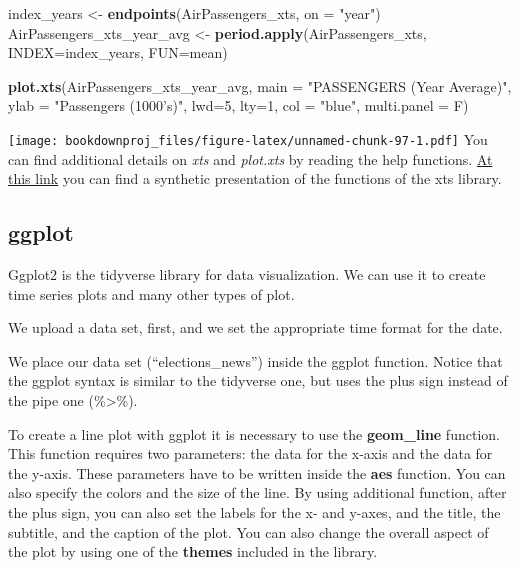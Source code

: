 \documentclass[
]{article}
\newenvironment{Shaded}{\begin{snugshade}}{\end{snugshade}}
\newcommand{\DataTypeTok}[1]{\textcolor[rgb]{0.13,0.29,0.53}{#1}}
\newcommand{\DecValTok}[1]{\textcolor[rgb]{0.00,0.00,0.81}{#1}}
\newcommand{\KeywordTok}[1]{\textcolor[rgb]{0.13,0.29,0.53}{\textbf{#1}}}
\newcommand{\NormalTok}[1]{#1}
\newcommand{\StringTok}[1]{\textcolor[rgb]{0.31,0.60,0.02}{#1}}
\begin{document}
\begin{Shaded}
\begin{Highlighting}[]
\NormalTok{index_years <-}\StringTok{ }\KeywordTok{endpoints}\NormalTok{(AirPassengers_xts, }\DataTypeTok{on =} \StringTok{"year"}\NormalTok{)}
\NormalTok{AirPassengers_xts_year_avg <-}\StringTok{ }\KeywordTok{period.apply}\NormalTok{(AirPassengers_xts, }\DataTypeTok{INDEX=}\NormalTok{index_years, }\DataTypeTok{FUN=}\NormalTok{mean)}

\KeywordTok{plot.xts}\NormalTok{(AirPassengers_xts_year_avg,}
         \DataTypeTok{main =} \StringTok{"PASSENGERS (Year Average)"}\NormalTok{,}
         \DataTypeTok{ylab =} \StringTok{"Passengers (1000's)"}\NormalTok{, }
         \DataTypeTok{lwd=}\DecValTok{5}\NormalTok{, }\DataTypeTok{lty=}\DecValTok{1}\NormalTok{,}
         \DataTypeTok{col =} \StringTok{"blue"}\NormalTok{,}
         \DataTypeTok{multi.panel =}\NormalTok{ F)}
\end{Highlighting}
\end{Shaded}

\texttt{[image: bookdownproj\_files/figure-latex/unnamed-chunk-97-1.pdf]}
You can find additional details on \emph{xts} and \emph{plot.xts} by reading the help functions. \href{https://s3.amazonaws.com/assets.datacamp.com/blog_assets/xts_Cheat_Sheet_R.pdf}{At this link} you can find a synthetic presentation of the functions of the xts library.

\hypertarget{ggplot}{%
\subsection{ggplot}\label{ggplot}}

Ggplot2 is the tidyverse library for data visualization. We can use it to create time series plots and many other types of plot.

We upload a data set, first, and we set the appropriate time format for the date.

We place our data set (``elections\_news'') inside the ggplot function. Notice that the ggplot syntax is similar to the tidyverse one, but uses the plus sign instead of the pipe one (\%\textgreater\%).

To create a line plot with ggplot it is necessary to use the \textbf{geom\_line} function. This function requires two parameters: the data for the x-axis and the data for the y-axis. These parameters have to be written inside the \textbf{aes} function. You can also specify the colors and the size of the line. By using additional function, after the plus sign, you can also set the labels for the x- and y-axes, and the title, the subtitle, and the caption of the plot. You can also change the overall aspect of the plot by using one of the \textbf{themes} included in the library.
\end{document}
